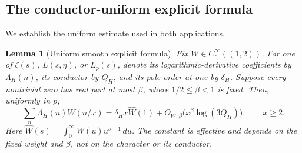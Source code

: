 \documentclass[11pt]{article}
\newtheorem{lemma}[theorem]{Lemma}
\begin{document}
\subsection*{The conductor-uniform explicit formula}
We establish the uniform estimate used in both applications.

\begin{lemma}[Uniform smooth explicit formula]\label{lem:uniform}
Fix $W\in C_c^\infty((1,2))$. For one of $\zeta(s)$, $L(s,\eta)$,
or $L_p(s)$, denote its logarithmic-derivative coefficients by
$\Lambda_H(n)$, its conductor by $Q_H$, and its pole order at one
by $\delta_H$. Suppose every nontrivial zero has real part at most
$\beta$, where $1/2\le\beta<1$ is fixed. Then, uniformly in $p$,
\[
 \sum_n\Lambda_H(n)W(n/x)
 =\delta_H x\widehat W(1)
       +O_{W,\beta}\bigl(x^\beta\log(3Q_H)\bigr),\qquad x\ge2.      \tag{1.6}\label{eq:uniform-explicit-formula}
\]
Here $\widehat W(s)=\int_0^\infty W(u)u^{s-1}\,du$.
The constant is effective and depends on the fixed weight and $\beta$,
not on the character or its conductor.
\end{lemma}
\end{document}
